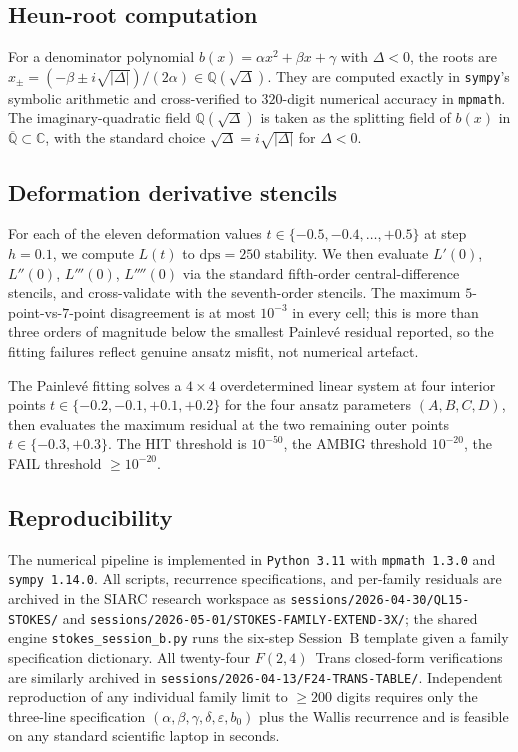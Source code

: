 \documentclass[11pt,reqno]{amsart}
\theoremstyle{definition}
\begin{document}
\subsection{Heun-root computation}\label{ssec:heun-roots}

For a denominator polynomial $b(x) = \alpha x^{2}+\beta x+\gamma$
with $\Delta<0$, the roots are
$x_{\pm} = (-\beta \pm i\sqrt{|\Delta|})/(2\alpha)
\in \mathbb{Q}(\sqrt{\Delta})$. They are computed exactly in
\texttt{sympy}'s symbolic arithmetic and cross-verified to
$320$-digit numerical accuracy in \texttt{mpmath}. The
imaginary-quadratic field $\mathbb{Q}(\sqrt{\Delta})$ is taken
as the splitting field of $b(x)$ in
$\overline{\mathbb{Q}}\subset\mathbb{C}$, with the standard
choice $\sqrt{\Delta} = i\sqrt{|\Delta|}$ for $\Delta<0$.

\subsection{Deformation derivative stencils}\label{ssec:stencils}

For each of the eleven deformation values
$t\in\{-0.5,-0.4,\ldots,+0.5\}$ at step $h=0.1$, we compute
$L(t)$ to $\mathrm{dps}=250$ stability. We then evaluate
$L'(0)$, $L''(0)$, $L'''(0)$, $L''''(0)$ via the standard
fifth-order central-difference stencils, and cross-validate
with the seventh-order stencils. The maximum
$5$-point-vs-$7$-point disagreement is at most $10^{-3}$ in
every cell; this is more than three orders of magnitude
below the smallest Painlev\'e residual reported, so the
fitting failures reflect genuine ansatz misfit, not numerical
artefact.

The Painlev\'e fitting solves a $4\times 4$ overdetermined
linear system at four interior points
$t\in\{-0.2,-0.1,+0.1,+0.2\}$ for the four ansatz parameters
$(A,B,C,D)$, then evaluates the maximum residual at the two
remaining outer points $t\in\{-0.3,+0.3\}$. The HIT threshold
is $10^{-50}$, the AMBIG threshold $10^{-20}$, the FAIL
threshold $\ge 10^{-20}$.

\subsection{Reproducibility}\label{ssec:repro}

The numerical pipeline is implemented in
\texttt{Python 3.11} with \texttt{mpmath~1.3.0} and
\texttt{sympy~1.14.0}. All scripts, recurrence specifications,
and per-family residuals are archived in the SIARC research
workspace as
\texttt{sessions/2026-04-30/QL15-STOKES/} and
\texttt{sessions/2026-05-01/STOKES-FAMILY-EXTEND-3X/}; the
shared engine \texttt{stokes\_session\_b.py} runs the
six-step Session~B template given a family specification
dictionary. All twenty-four $F(2,4)$~Trans closed-form
verifications are similarly archived in
\texttt{sessions/2026-04-13/F24-TRANS-TABLE/}. Independent
reproduction of any individual family limit to $\ge 200$
digits requires only the three-line specification
$(\alpha,\beta,\gamma,\delta,\varepsilon,b_{0})$ plus the
Wallis recurrence and is feasible on any standard scientific
laptop in seconds.
\end{document}
